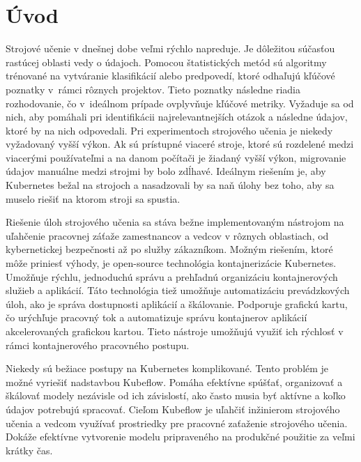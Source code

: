 
{}

\chapter*{Úvod}

Strojové učenie v dnešnej dobe veľmi rýchlo napreduje. Je dôležitou súčasťou rastúcej oblasti vedy o údajoch. Pomocou štatistických metód sú algoritmy trénované na vytváranie klasifikácií alebo predpovedí, ktoré odhaľujú kľúčové poznatky v~rámci rôznych projektov. Tieto poznatky následne riadia rozhodovanie, čo v~ideálnom prípade ovplyvňuje kľúčové metriky. Vyžaduje sa od nich, aby pomáhali pri identifikácii najrelevantnejších otázok a následne údajov, ktoré by na nich odpovedali. Pri experimentoch strojového učenia je niekedy vyžadovaný vyšší výkon. Ak sú prístupné viaceré stroje, ktoré sú rozdelené medzi viacerými používateľmi a na danom počítači je žiadaný vyšší výkon, migrovanie údajov manuálne medzi strojmi by bolo zdĺhavé. Ideálnym riešením je, aby Kubernetes bežal na strojoch a nasadzovali by sa naň úlohy bez toho, aby sa muselo riešiť na ktorom stroji sa spustia.

Riešenie úloh strojového učenia sa stáva bežne implementovaným nástrojom na uľahčenie pracovnej záťaže zamestnancov a vedcov v rôznych oblastiach, od kybernetickej bezpečnosti až po služby zákazníkom. Možným riešením, ktoré môže priniesť výhody, je open-source technológia kontajnerizácie Kubernetes. Umožňuje rýchlu, jednoduchú správu a prehľadnú organizáciu kontajnerových služieb a aplikácií. Táto technológia tiež umožňuje automatizáciu prevádzkových úloh, ako je správa dostupnosti aplikácií a škálovanie. Podporuje grafickú kartu, čo urýchľuje pracovný tok a automatizuje správu kontajnerov aplikácií akcelerovaných grafickou kartou. Tieto nástroje umožňujú využiť ich rýchlosť v rámci kontajnerového pracovného postupu.

Niekedy sú bežiace postupy na Kubernetes komplikované. Tento problém je možné vyriešiť nadstavbou Kubeflow. Pomáha efektívne spúšťať, organizovať a škálovať modely nezávisle od ich závislostí, ako často musia byť aktívne a koľko údajov potrebujú spracovať. Cieľom Kubeflow je uľahčiť inžinierom strojového učenia a vedcom využívať prostriedky pre pracovné zaťaženie strojového učenia. Dokáže efektívne vytvorenie modelu pripraveného na produkčné použitie za veľmi krátky čas.

